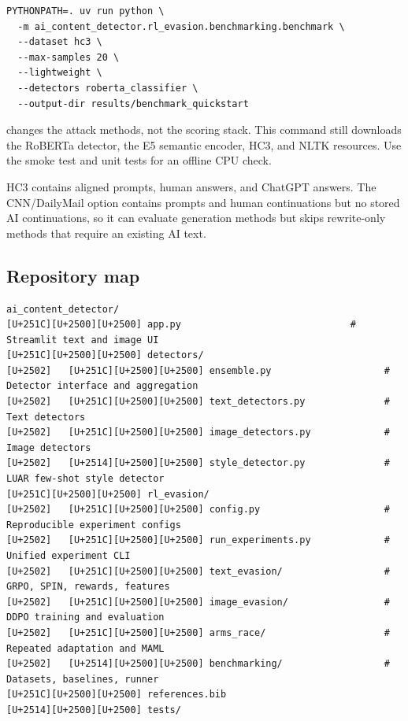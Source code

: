 \begin{Verbatim}
PYTHONPATH=. uv run python \
  -m ai_content_detector.rl_evasion.benchmarking.benchmark \
  --dataset hc3 \
  --max-samples 20 \
  --lightweight \
  --detectors roberta_classifier \
  --output-dir results/benchmark_quickstart
\end{Verbatim}

\texttt{} changes the attack methods, not the
scoring stack. This command still downloads the RoBERTa detector, the E5
semantic encoder, HC3, and NLTK resources. Use the smoke test and unit
tests for an offline CPU check.

HC3 contains aligned prompts, human answers, and ChatGPT answers. The
CNN/DailyMail option contains prompts and human continuations but no
stored AI continuations, so it can evaluate generation methods but skips
rewrite-only methods that require an existing AI text.

\subsection{Repository
map}\label{record-docs-research-guide-md-repository-map}

\begin{Verbatim}
ai_content_detector/
[U+251C][U+2500][U+2500] app.py                              # Streamlit text and image UI
[U+251C][U+2500][U+2500] detectors/
[U+2502]   [U+251C][U+2500][U+2500] ensemble.py                    # Detector interface and aggregation
[U+2502]   [U+251C][U+2500][U+2500] text_detectors.py              # Text detectors
[U+2502]   [U+251C][U+2500][U+2500] image_detectors.py             # Image detectors
[U+2502]   [U+2514][U+2500][U+2500] style_detector.py              # LUAR few-shot style detector
[U+251C][U+2500][U+2500] rl_evasion/
[U+2502]   [U+251C][U+2500][U+2500] config.py                      # Reproducible experiment configs
[U+2502]   [U+251C][U+2500][U+2500] run_experiments.py             # Unified experiment CLI
[U+2502]   [U+251C][U+2500][U+2500] text_evasion/                  # GRPO, SPIN, rewards, features
[U+2502]   [U+251C][U+2500][U+2500] image_evasion/                 # DDPO training and evaluation
[U+2502]   [U+251C][U+2500][U+2500] arms_race/                     # Repeated adaptation and MAML
[U+2502]   [U+2514][U+2500][U+2500] benchmarking/                  # Datasets, baselines, runner
[U+251C][U+2500][U+2500] references.bib
[U+2514][U+2500][U+2500] tests/
\end{Verbatim}

